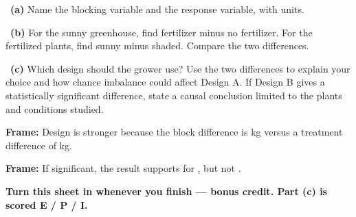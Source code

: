 \documentclass[11pt]{article}
\begin{document}
~\textbf{(a)} Name the blocking variable and the response variable, with units.\par
\workspace{0.8in}

~\textbf{(b)} For the sunny greenhouse, find fertilizer minus no fertilizer. For the fertilized plants, find sunny minus shaded. Compare the two differences.\par
\workspace{1.4in}

~\textbf{(c)} Which design should the grower use? Use the two differences to explain your choice and how chance imbalance could affect Design A. If Design B gives a statistically significant difference, state a causal conclusion limited to the plants and conditions studied.\par
\workspace{2.0in}

\begin{sentenceframebox}\raggedright\textbf{Frame:} Design \blank[0.4in] is stronger because the block difference is \blank[0.7in] kg versus a treatment difference of \blank[0.7in] kg.\end{sentenceframebox}

\begin{sentenceframebox}\raggedright\textbf{Frame:} If significant, the result supports \blank[2.2in] for \blank[1.6in], but not \blank[1.5in].\end{sentenceframebox}

\textbf{Turn this sheet in whenever you finish --- bonus credit. Part (c) is scored E / P / I.}\par
\end{document}
